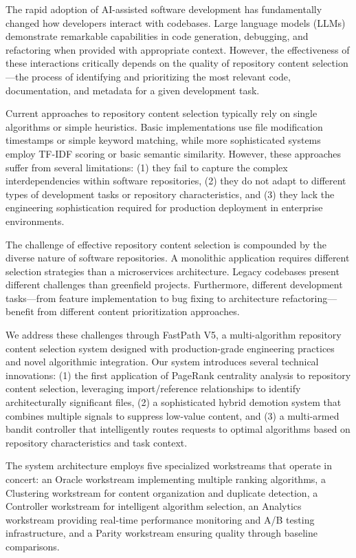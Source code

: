 \documentclass[conference]{IEEEtran}
\begin{document}
The rapid adoption of AI-assisted software development has fundamentally changed how developers interact with codebases. Large language models (LLMs) demonstrate remarkable capabilities in code generation, debugging, and refactoring when provided with appropriate context. However, the effectiveness of these interactions critically depends on the quality of repository content selection—the process of identifying and prioritizing the most relevant code, documentation, and metadata for a given development task.

Current approaches to repository content selection typically rely on single algorithms or simple heuristics. Basic implementations use file modification timestamps or simple keyword matching, while more sophisticated systems employ TF-IDF scoring or basic semantic similarity. However, these approaches suffer from several limitations: (1) they fail to capture the complex interdependencies within software repositories, (2) they do not adapt to different types of development tasks or repository characteristics, and (3) they lack the engineering sophistication required for production deployment in enterprise environments.

The challenge of effective repository content selection is compounded by the diverse nature of software repositories. A monolithic application requires different selection strategies than a microservices architecture. Legacy codebases present different challenges than greenfield projects. Furthermore, different development tasks—from feature implementation to bug fixing to architecture refactoring—benefit from different content prioritization approaches.

We address these challenges through FastPath V5, a multi-algorithm repository content selection system designed with production-grade engineering practices and novel algorithmic integration. Our system introduces several technical innovations: (1) the first application of PageRank centrality analysis to repository content selection, leveraging import/reference relationships to identify architecturally significant files, (2) a sophisticated hybrid demotion system that combines multiple signals to suppress low-value content, and (3) a multi-armed bandit controller that intelligently routes requests to optimal algorithms based on repository characteristics and task context.

The system architecture employs five specialized workstreams that operate in concert: an Oracle workstream implementing multiple ranking algorithms, a Clustering workstream for content organization and duplicate detection, a Controller workstream for intelligent algorithm selection, an Analytics workstream providing real-time performance monitoring and A/B testing infrastructure, and a Parity workstream ensuring quality through baseline comparisons.
\end{document}
